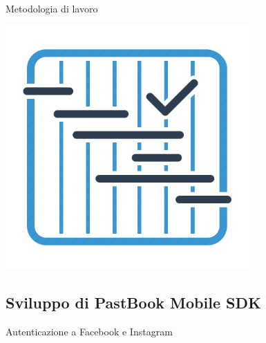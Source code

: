 \begin{frame}{Metodologia di lavoro}
\begin{minipage}{0.49\textwidth}
			\end{minipage}
			\begin{minipage}{0.49\textwidth}
				\centering
				\includegraphics[width=0.7\textwidth]{capitolo_3/immagini/pianificazione.png}
			\end{minipage}			
		\end{frame}
	\subsection{Sviluppo di PastBook Mobile SDK}
		\begin{frame}{Autenticazione a Facebook e Instagram}
			\fontsize{8pt}{7}\selectfont
			
		\end{frame}
